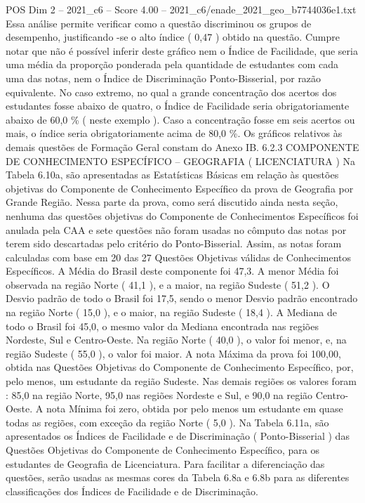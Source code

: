 \begin{textsample}{POS Dim 2 – 2021\_c6 – Score 4.00 – 2021\_c6/enade\_2021\_geo\_b7744036e1.txt}
Essa análise permite verificar como a questão discriminou os grupos de desempenho, justificando -se o alto índice ( 0,47 ) obtido na questão.
Cumpre notar que não é possível inferir deste gráfico nem o Índice de Facilidade, que seria uma média da proporção ponderada pela quantidade de estudantes com cada uma das notas, nem o Índice de Discriminação Ponto-Bisserial, por razão equivalente.
No caso extremo, no qual a grande concentração dos acertos dos estudantes fosse abaixo de quatro, o Índice de Facilidade seria obrigatoriamente abaixo de 60,0 \% ( neste exemplo ).
Caso a concentração fosse em seis acertos ou mais, o índice seria obrigatoriamente acima de 80,0 \%.
Os gráficos relativos às demais questões de Formação Geral constam do Anexo IB. 6.2.3 COMPONENTE DE CONHECIMENTO ESPECÍFICO – GEOGRAFIA ( LICENCIATURA ) Na Tabela 6.10a, são apresentadas as Estatísticas Básicas em relação às questões objetivas do Componente de Conhecimento Específico da prova de Geografia por Grande Região.
Nessa parte da prova, como será discutido ainda nesta seção, nenhuma das questões objetivas do Componente de Conhecimentos Específicos foi anulada pela CAA e sete questões não foram usadas no cômputo das notas por terem sido descartadas pelo critério do Ponto-Bisserial.
Assim, as notas foram calculadas com base em 20 das 27 Questões Objetivas válidas de Conhecimentos Específicos.
A Média do Brasil deste componente foi 47,3.
A menor Média foi observada na região Norte ( 41,1 ), e a maior, na região Sudeste ( 51,2 ).
O Desvio padrão de todo o Brasil foi 17,5, sendo o menor Desvio padrão encontrado na região Norte ( 15,0 ), e o maior, na região Sudeste ( 18,4 ).
A Mediana de todo o Brasil foi 45,0, o mesmo valor da Mediana encontrada nas regiões Nordeste, Sul e Centro-Oeste.
Na região Norte ( 40,0 ), o valor foi menor, e, na região Sudeste ( 55,0 ), o valor foi maior.
A nota Máxima da prova foi 100,00, obtida nas Questões Objetivas do Componente de Conhecimento Específico, por, pelo menos, um estudante da região Sudeste.
Nas demais regiões os valores foram : 85,0 na região Norte, 95,0 nas regiões Nordeste e Sul, e 90,0 na região Centro-Oeste.
A nota Mínima foi zero, obtida por pelo menos um estudante em quase todas as regiões, com exceção da região Norte ( 5,0 ).
Na Tabela 6.11a, são apresentados os Índices de Facilidade e de Discriminação ( Ponto-Bisserial ) das Questões Objetivas do Componente de Conhecimento Específico, para os estudantes de Geografia de Licenciatura.
Para facilitar a diferenciação das questões, serão usadas as mesmas cores da Tabela 6.8a e 6.8b para as diferentes classificações dos Índices de Facilidade e de Discriminação.

\end{textsample}
